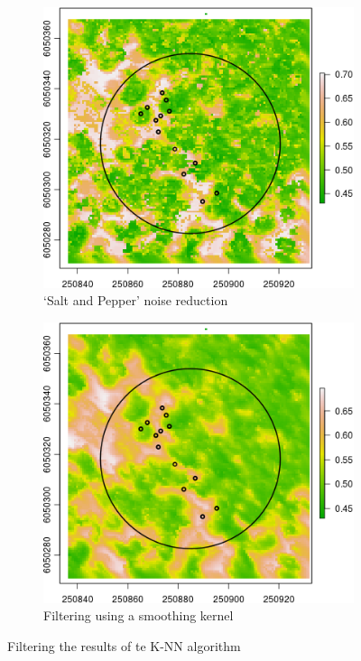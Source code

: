 \documentclass{subfiles}
\begin{document}
	 \begin{figure} [h!]				   
	   \begin{subfigure}[t]{.49\textwidth}
	   \centering
	   \includegraphics[width=\textwidth]{img/dead/c2_knn_SaltPepper}
	   \caption{`Salt and Pepper' noise reduction} 
	   \label{fig:c2_SaltPepper}
	   \end{subfigure}
	   \begin{subfigure}[t]{.49\textwidth}
	   \centering
	   \includegraphics[width=\textwidth]{img/dead/c3_knn_smoothed}
	   \caption{Filtering using a smoothing kernel} 
	   \label{fig:c3_Smoothed}
	   \end{subfigure}
	   \caption{Filtering the results of te K-NN algorithm}  
	   \label{fig:salt_smooth} 
	\end{figure}
\end{document}
